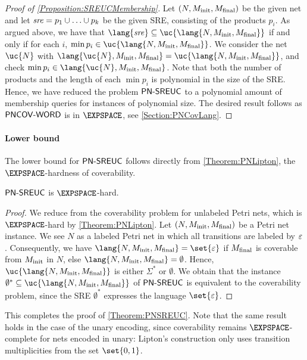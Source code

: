 \documentclass[../../diss.tex]{subfiles}
\begin{document}
\begin{proof}[Proof of \cref{Proposition:SREUCMembership}]
    Let $(N,M_{\text{init}},M_{\text{final}})$ be the given net and let $\mathit{sre} = p_1 \cup \ldots \cup p_k$ be the given SRE, consisting of the products $p_i$.
    As argued above, we have that $\lang{\sre} \subseteq \uc{\lang{N,\Minit,\Mfinal}}$ if and only if for each $i$, $\min p_i \in \uc{\lang{N,\Minit,\Mfinal}}$.
    We consider the net $\mathmbox{\uc{N}}$ with $\lang{\mathmbox{\uc{N}},\Minit,\Mfinal} = \mathmbox{\uc{\lang{N,\Minit,\Mfinal}}}$, and check $\min p_i \in \lang{\uc{N},\Minit,\Mfinal}$.
    Note that both the number of products and the length of each $\min p_i$ is polynomial in the size of the SRE.\@
    Hence, we have reduced the problem $\mathsf{PN\text{-}SREUC}$ to a polynomial amount of membership queries for instances of polynomial size.
    The desired result follows as $\mathsf{PNCOV\text{-}WORD}$ is in $\EXPSPACE$, see \cref{Section:PNCovLang}.
\end{proof}

\paragraph{Lower bound}

The lower bound for $\mathsf{PN\text{-}SREUC}$ follows directly from \cref{Theorem:PNLipton}, the $\EXPSPACE$-hardness of coverability.

\begin{lemma}%
\label{Lemma:PNSREUChardness}%
    $\mathsf{PN\text{-}SREUC}$ is $\EXPSPACE$-hard.
\end{lemma}

\begin{proof}
    We reduce from the coverability problem for unlabeled Petri nets, which is $\EXPSPACE$-hard by \cref{Theorem:PNLipton}.
    Let $(N,M_{\text{init}},M_{\text{final}})$ be a Petri net instance.
    We see $N$ as a labeled Petri net in which all transitions are labeled by $\varepsilon$.
    Consequently, we have $\lang{N,\Minit,\Mfinal} = \set{\eps}$ if $M_{\text{final}}$ is coverable from $M_{\text{init}}$ in $N$, else $\lang{N,\Minit,\Mfinal} = \emptyset$.
    Hence, $\uc{\lang{N,\Minit,\Mfinal}}$ is either $\Sigma^*$ or $\emptyset$.
    We obtain that the instance $\emptyset^* \subseteq \uc{\lang{N,\Minit,\Mfinal}}$ of $\mathsf{PN\text{-}SREUC}$ is equivalent to the coverability problem, since the SRE $\emptyset^*$ expresses the language $\set{\eps}$.
\end{proof}

This completes the proof of \cref{Theorem:PNSREUC}.
Note that the same result holds in the case of the unary encoding, since coverability remains $\EXPSPACE$-complete for nets encoded in unary:
Lipton's construction only uses transition multiplicities from the set $\set{0,1}$.
\end{document}
